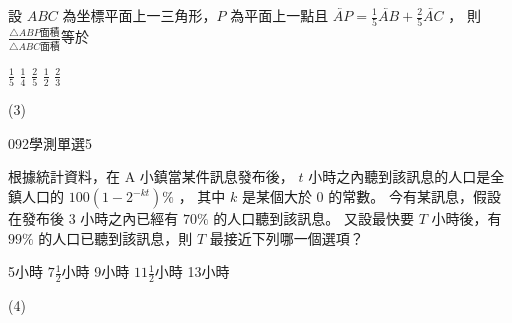 \begin{QUESTIONS}
\begin{QUESTION}
\begin{QBODY}
            設 $ABC$ 為坐標平面上一三角形，$P$ 為平面上一點且 $\lvec{AP} = \frac{1}{5} \lvec{AB} + \frac{2}{5} \lvec{AC}$ ， 則 $\frac{\triangle ABP \mbox{面積}}{ \triangle ABC \mbox{面積}}$等於 
            \begin{QOPS}
                \QOP $\frac{1}{5}$ 
                \QOP $\frac{1}{4}$ 
                \QOP $\frac{2}{5}$ 
                \QOP $\frac{1}{2}$         
                \QOP $\frac{2}{3}$
            \end{QOPS}
        \end{QBODY}
        \begin{QFROMS}
        \end{QFROMS}
        \begin{QTAGS}\end{QTAGS}
        \begin{QANS}
            (3)
        \end{QANS}
        \begin{QSOLLIST}
        \end{QSOLLIST}
        \begin{QEMPTYSPACE}
        \end{QEMPTYSPACE}
    \end{QUESTION}
    \begin{QUESTION}
        \begin{ExamInfo}{092}{學測}{單選}{5}
        \end{ExamInfo}
        \begin{ExamAnsRateInfo}{22}{43}{15}{8}
        \end{ExamAnsRateInfo}
        \begin{QBODY}
            根據統計資料，在  A 小鎮當某件訊息發布後， 
            $t$ 小時之內聽到該訊息的人口是全鎮人口的 $100(1- 2^{-kt})\%$ ，
            其中 $k$ 是某個大於 0 的常數。
            今有某訊息，假設在發布後 3 小時之內已經有 $70\%$ 的人口聽到該訊息。
            又設最快要 $T$ 小時後，有 $99\%$ 的人口已聽到該訊息，則 $T$ 最接近下列哪一個選項？
            \begin{QOPS} 
                \QOP 5小時        
                \QOP $7\frac{1}{2}$小時
                \QOP 9小時 
                \QOP $11\frac{1}{2}$小時 
                \QOP13小時
            \end{QOPS}
        \end{QBODY}
        \begin{QFROMS}
        \end{QFROMS}
        \begin{QTAGS}\end{QTAGS}
        \begin{QANS}
            (4)
        \end{QANS}
        \begin{QSOLLIST}
        \end{QSOLLIST}
        \begin{QEMPTYSPACE}
        \end{QEMPTYSPACE}
    \end{QUESTION}
\end{QUESTIONS}
